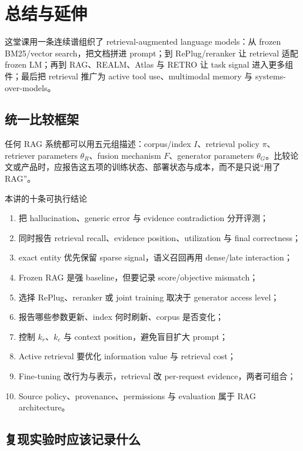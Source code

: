 \section{总结与延伸}

这堂课用一条连续谱组织了 retrieval-augmented language models：从 frozen BM25/vector search，把文档拼进 prompt；到 RePlug/reranker 让 retrieval 适配 frozen LM；再到 RAG、REALM、Atlas 与 RETRO 让 task signal 进入更多组件；最后把 retrieval 推广为 active tool use、multimodal memory 与 systems-over-models。

\subsection{统一比较框架}

任何 RAG 系统都可以用五元组描述：corpus/index $I$、retrieval policy $\pi$、retriever parameters $\theta_R$、fusion mechanism $F$、generator parameters $\theta_G$。比较论文或产品时，应报告这五项的训练状态、部署状态与成本，而不是只说“用了 RAG”。

\begin{importantbox}{本讲的十条可执行结论}
\begin{enumerate}
  \item 把 hallucination、generic error 与 evidence contradiction 分开评测；
  \item 同时报告 retrieval recall、evidence position、utilization 与 final correctness；
  \item exact entity 优先保留 sparse signal，语义召回再用 dense/late interaction；
  \item Frozen RAG 是强 baseline，但要记录 score/objective mismatch；
  \item 选择 RePlug、reranker 或 joint training 取决于 generator access level；
  \item 报告哪些参数更新、index 何时刷新、corpus 是否变化；
  \item 控制 $k_r$、$k_c$ 与 context position，避免盲目扩大 prompt；
  \item Active retrieval 要优化 information value 与 retrieval cost；
  \item Fine-tuning 改行为与表示，retrieval 改 per-request evidence，两者可组合；
  \item Source policy、provenance、permissions 与 evaluation 属于 RAG architecture。
\end{enumerate}
\end{importantbox}

\subsection{复现实验时应该记录什么}

